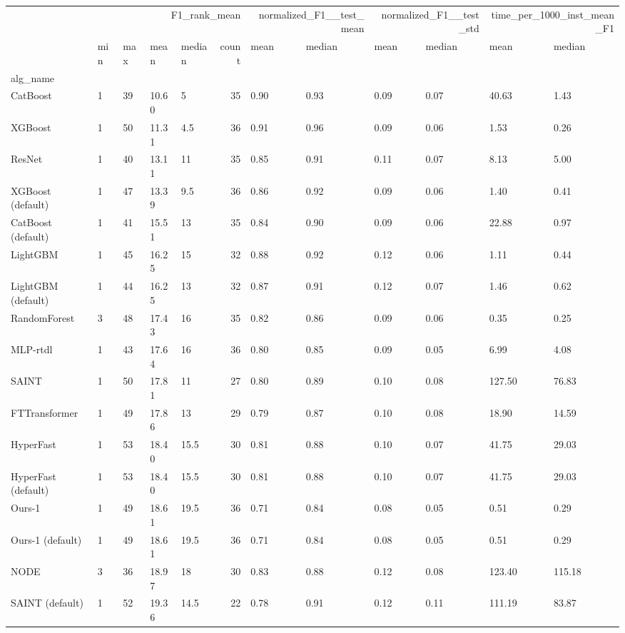 \begin{tabular}{lllllrllllll}
\toprule
 & \multicolumn{5}{r}{F1_rank_mean} & \multicolumn{2}{r}{normalized_F1__test_mean} & \multicolumn{2}{r}{normalized_F1__test_std} & \multicolumn{2}{r}{time_per_1000_inst_mean_F1} \\
 & min & max & mean & median & count & mean & median & mean & median & mean & median \\
alg_name &  &  &  &  &  &  &  &  &  &  &  \\
\midrule
CatBoost & 1 & 39 & 10.60 & 5 & 35 & 0.90 & 0.93 & 0.09 & 0.07 & 40.63 & 1.43 \\
XGBoost & 1 & 50 & 11.31 & 4.5 & 36 & 0.91 & 0.96 & 0.09 & 0.06 & 1.53 & 0.26 \\
ResNet & 1 & 40 & 13.11 & 11 & 35 & 0.85 & 0.91 & 0.11 & 0.07 & 8.13 & 5.00 \\
XGBoost (default) & 1 & 47 & 13.39 & 9.5 & 36 & 0.86 & 0.92 & 0.09 & 0.06 & 1.40 & 0.41 \\
CatBoost (default) & 1 & 41 & 15.51 & 13 & 35 & 0.84 & 0.90 & 0.09 & 0.06 & 22.88 & 0.97 \\
LightGBM & 1 & 45 & 16.25 & 15 & 32 & 0.88 & 0.92 & 0.12 & 0.06 & 1.11 & 0.44 \\
LightGBM (default) & 1 & 44 & 16.25 & 13 & 32 & 0.87 & 0.91 & 0.12 & 0.07 & 1.46 & 0.62 \\
RandomForest & 3 & 48 & 17.43 & 16 & 35 & 0.82 & 0.86 & 0.09 & 0.06 & 0.35 & 0.25 \\
MLP-rtdl & 1 & 43 & 17.64 & 16 & 36 & 0.80 & 0.85 & 0.09 & 0.05 & 6.99 & 4.08 \\
SAINT & 1 & 50 & 17.81 & 11 & 27 & 0.80 & 0.89 & 0.10 & 0.08 & 127.50 & 76.83 \\
FTTransformer & 1 & 49 & 17.86 & 13 & 29 & 0.79 & 0.87 & 0.10 & 0.08 & 18.90 & 14.59 \\
HyperFast & 1 & 53 & 18.40 & 15.5 & 30 & 0.81 & 0.88 & 0.10 & 0.07 & 41.75 & 29.03 \\
HyperFast (default) & 1 & 53 & 18.40 & 15.5 & 30 & 0.81 & 0.88 & 0.10 & 0.07 & 41.75 & 29.03 \\
Ours-1 & 1 & 49 & 18.61 & 19.5 & 36 & 0.71 & 0.84 & 0.08 & 0.05 & 0.51 & 0.29 \\
Ours-1 (default) & 1 & 49 & 18.61 & 19.5 & 36 & 0.71 & 0.84 & 0.08 & 0.05 & 0.51 & 0.29 \\
NODE & 3 & 36 & 18.97 & 18 & 30 & 0.83 & 0.88 & 0.12 & 0.08 & 123.40 & 115.18 \\
SAINT (default) & 1 & 52 & 19.36 & 14.5 & 22 & 0.78 & 0.91 & 0.12 & 0.11 & 111.19 & 83.87 \\

\end{tabular}
